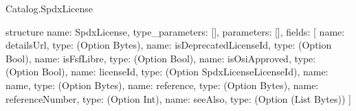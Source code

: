 \begin{lexlean}{Catalog.SpdxLicense}
\begin{semanticmodule}
structure{
  name: SpdxLicense,
  type_parameters: [],
  parameters: [],
  fields: [
    {name: detailsUrl, type: (Option Bytes)},
    {name: isDeprecatedLicenseId, type: (Option Bool)},
    {name: isFsfLibre, type: (Option Bool)},
    {name: isOsiApproved, type: (Option Bool)},
    {name: licenseId, type: (Option SpdxLicenseLicenseId)},
    {name: name, type: (Option Bytes)},
    {name: reference, type: (Option Bytes)},
    {name: referenceNumber, type: (Option Int)},
    {name: seeAlso, type: (Option (List Bytes))}
  ]
}
\end{semanticmodule}
\end{lexlean}
